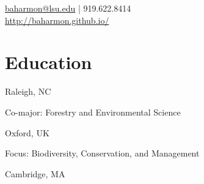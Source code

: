 \documentclass[]{baharmon-cv}
\begin{document}
%
%

%
%
{\vspace*{0.1cm} 
\href{mailto:baharmon@lsu.edu}{baharmon@lsu.edu} | 919.622.8414 \\
\url{http://baharmon.github.io/}\\
}
%
%


%
%


\vspace*{0.2cm}
\section{Education} 
\begin{minipage}[t]{0.85\textwidth} 
\end{minipage}
\begin{minipage}[t]{0.15\textwidth} 
Raleigh, NC
\end{minipage}
Co-major: Forestry and Environmental Science
\vspace*{0.1cm}

\begin{minipage}[t]{0.85\textwidth} 
\end{minipage}
\begin{minipage}[t]{0.15\textwidth} 
Oxford, UK
\end{minipage}
Focus: Biodiversity, Conservation, and Management
\vspace*{0.1cm}

\begin{minipage}[t]{0.85\textwidth} 
\end{minipage}
\begin{minipage}[t]{0.20\textwidth} 
Cambridge, MA
\end{minipage}
\vspace*{0.1cm}
\end{document}
